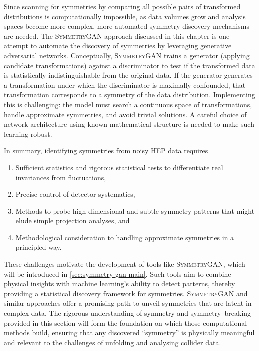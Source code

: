             Since scanning for symmetries by comparing all possible pairs of transformed distributions is computationally impossible, as data volumes grow and analysis spaces become more complex, more automated symmetry discovery mechanisms are needed.
            The \textsc{SymmetryGAN} approach discussed in this chapter is one attempt to automate the discovery of symmetries by leveraging generative adversarial networks.
            Conceptually, \textsc{SymmetryGAN} trains a generator (applying candidate transformations) against a discriminator to test if the transformed data is statistically indistinguishable from the original data.
            If the generator generates a transformation under which the discriminator is maximally confounded, that transformation corresponds to a symmetry of the data distribution.
            Implementing this is challenging: the model must search a continuous space of transformations, handle approximate symmetries, and avoid trivial solutions.
            A careful choice of network architecture using known mathematical structure is needed to make such learning robust.

            In summary, identifying symmetries from noisy HEP data requires
            \begin{enumerate}
                \item Sufficient statistics and rigorous statistical tests to differentiate real invariances from fluctuations,
                \item Precise control of detector systematics,
                \item Methods to probe high dimensional and subtle symmetry patterns that might elude simple projection analyses, and
                \item Methodological consideration to handling approximate symmetries in a principled way.
            \end{enumerate}
            These challenges motivate the development of tools like \textsc{SymmetryGAN}, which will be introduced in \cref{sec:symmetry-gan-main}.
            Such tools aim to combine physical insights with machine learning's ability to detect patterns, thereby providing a statistical discovery framework for symmetries.
            \textsc{SymmetryGAN} and similar approaches offer a promising path to unveil symmetries that are latent in complex data.
            The rigorous understanding of symmetry and symmetry--breaking provided in this section will form the foundation on which those computational methods build, ensuring that any discovered ``symmetry'' is physically meaningful and relevant to the challenges of unfolding and analysing collider data.

